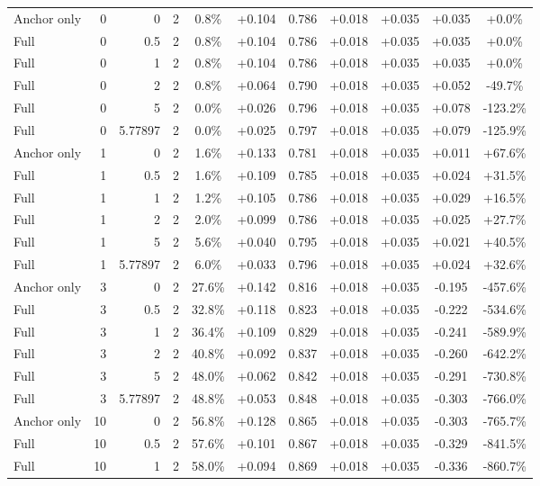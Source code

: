 \begin{table}[htbp]
\begin{tabular}{lrrrccccccc}
Anchor only & 0 & 0 & 2 & 0.8\% & +0.104 & 0.786 & +0.018 & +0.035 & +0.035 & +0.0\% \\
Full & 0 & 0.5 & 2 & 0.8\% & +0.104 & 0.786 & +0.018 & +0.035 & +0.035 & +0.0\% \\
Full & 0 & 1 & 2 & 0.8\% & +0.104 & 0.786 & +0.018 & +0.035 & +0.035 & +0.0\% \\
Full & 0 & 2 & 2 & 0.8\% & +0.064 & 0.790 & +0.018 & +0.035 & +0.052 & -49.7\% \\
Full & 0 & 5 & 2 & 0.0\% & +0.026 & 0.796 & +0.018 & +0.035 & +0.078 & -123.2\% \\
Full & 0 & 5.77897 & 2 & 0.0\% & +0.025 & 0.797 & +0.018 & +0.035 & +0.079 & -125.9\% \\
Anchor only & 1 & 0 & 2 & 1.6\% & +0.133 & 0.781 & +0.018 & +0.035 & +0.011 & +67.6\% \\
Full & 1 & 0.5 & 2 & 1.6\% & +0.109 & 0.785 & +0.018 & +0.035 & +0.024 & +31.5\% \\
Full & 1 & 1 & 2 & 1.2\% & +0.105 & 0.786 & +0.018 & +0.035 & +0.029 & +16.5\% \\
Full & 1 & 2 & 2 & 2.0\% & +0.099 & 0.786 & +0.018 & +0.035 & +0.025 & +27.7\% \\
Full & 1 & 5 & 2 & 5.6\% & +0.040 & 0.795 & +0.018 & +0.035 & +0.021 & +40.5\% \\
Full & 1 & 5.77897 & 2 & 6.0\% & +0.033 & 0.796 & +0.018 & +0.035 & +0.024 & +32.6\% \\
Anchor only & 3 & 0 & 2 & 27.6\% & +0.142 & 0.816 & +0.018 & +0.035 & -0.195 & -457.6\% \\
Full & 3 & 0.5 & 2 & 32.8\% & +0.118 & 0.823 & +0.018 & +0.035 & -0.222 & -534.6\% \\
Full & 3 & 1 & 2 & 36.4\% & +0.109 & 0.829 & +0.018 & +0.035 & -0.241 & -589.9\% \\
Full & 3 & 2 & 2 & 40.8\% & +0.092 & 0.837 & +0.018 & +0.035 & -0.260 & -642.2\% \\
Full & 3 & 5 & 2 & 48.0\% & +0.062 & 0.842 & +0.018 & +0.035 & -0.291 & -730.8\% \\
Full & 3 & 5.77897 & 2 & 48.8\% & +0.053 & 0.848 & +0.018 & +0.035 & -0.303 & -766.0\% \\
Anchor only & 10 & 0 & 2 & 56.8\% & +0.128 & 0.865 & +0.018 & +0.035 & -0.303 & -765.7\% \\
Full & 10 & 0.5 & 2 & 57.6\% & +0.101 & 0.867 & +0.018 & +0.035 & -0.329 & -841.5\% \\
Full & 10 & 1 & 2 & 58.0\% & +0.094 & 0.869 & +0.018 & +0.035 & -0.336 & -860.7\% \\

\end{tabular}
\end{table}
